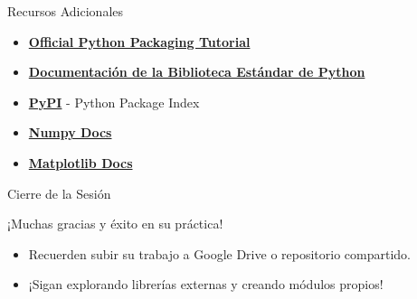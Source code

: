 \documentclass[10pt]{beamer}
\begin{document}
\begin{frame}{Recursos Adicionales}
  \begin{itemize}
    \item \href{https://packaging.python.org/tutorials/installing-packages/}{\textbf{Official Python Packaging Tutorial}}
    \item \href{https://docs.python.org/3/library/}{\textbf{Documentación de la Biblioteca Estándar de Python}}
    \item \href{https://pypi.org/}{\textbf{PyPI}} - Python Package Index
    \item \href{https://numpy.org/doc/}{\textbf{Numpy Docs}}
    \item \href{https://matplotlib.org/stable/}{\textbf{Matplotlib Docs}}
  \end{itemize}
\end{frame}

\begin{frame}{Cierre de la Sesión}
  \huge{\centerline{¡Muchas gracias y éxito en su práctica!}}
  \vspace{0.4cm}
  \normalsize
  \begin{itemize}
    \item Recuerden subir su trabajo a Google Drive o repositorio compartido.
    \item ¡Sigan explorando librerías externas y creando módulos propios!
  \end{itemize}
\end{frame}
\end{document}
